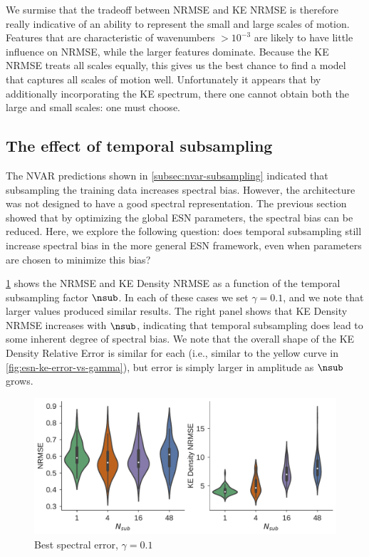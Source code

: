 We surmise that the tradeoff between NRMSE and KE NRMSE is therefore really
indicative of an ability to represent the small and large scales of motion.
Features that are characteristic of wavenumbers $> 10^{-3}$ are likely to have
little influence on NRMSE, while the larger features dominate.
Because the KE NRMSE treats all scales equally, this gives us the best chance to
find a model that captures all scales of motion well.
Unfortunately it appears that by additionally incorporating the KE spectrum,
there one cannot obtain both the large and small scales: one must choose.



\subsection{The effect of temporal subsampling}
\label{subsec:esn-subsampling}


The NVAR predictions shown in \cref{subsec:nvar-subsampling} indicated that
subsampling the training data increases spectral bias.
However, the architecture was not designed to have a good spectral
representation.
The previous section showed that by optimizing the global ESN parameters, the
spectral bias can be reduced.
Here, we explore the following question: does temporal subsampling still
increase spectral bias in the more general ESN framework, even when parameters
are chosen to minimize this bias?

\cref{fig:esn-best-spec-error-vs-nsub} shows the NRMSE and KE Density NRMSE as a
function of the temporal subsampling factor $\nsub$.
In each of these cases we set $\gamma=0.1$, and we note that larger values
produced similar results.
The right panel shows that KE Density NRMSE increases with $\nsub$, indicating
that temporal subsampling does lead to some inherent degree of spectral bias.
We note that the overall shape of the KE Density Relative Error is similar for
each (i.e., similar to the yellow curve in \cref{fig:esn-ke-error-vs-gamma}),
but error is simply larger in amplitude as $\nsub$ grows.

\begin{figure}
    \centering
    \includegraphics[width=.8\textwidth]{../figures/rc_nrmse_kenrmse_gamma0.1.pdf}
    \caption{Best spectral error, $\gamma=0.1$}
    \label{fig:esn-best-spec-error-vs-nsub}
\end{figure}

